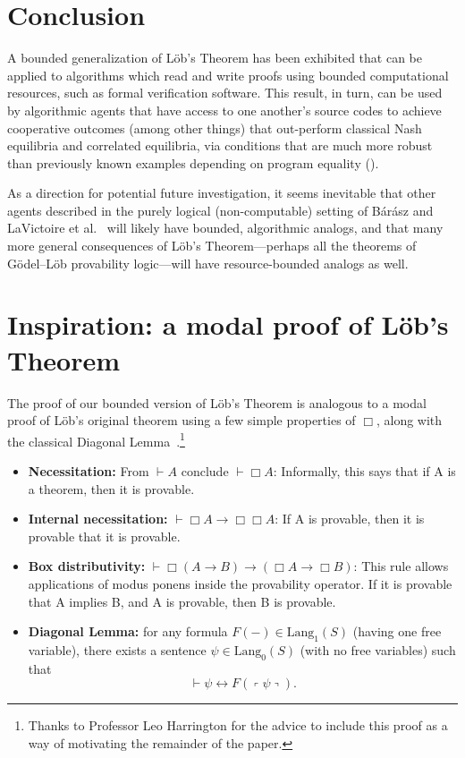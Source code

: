 \documentclass[onecolumn]{miri-tech-article}
\numberwithin{equation}{section}
\theoremstyle{definition}
\newcommand{\proves}[1]{\underset{#1}{\vdash}}
\newcommand{\Lang}{\mathrm{Lang}}
\renewcommand{\iff}{\leftrightarrow}
\newcommand{\qquote}[1]{\left\ulcorner #1 \right\urcorner}
\renewcommand{\-}{^{-1}}
\begin{document}
\section{Conclusion}
A bounded generalization of L\"{o}b's Theorem has been exhibited that can be applied to algorithms which read and write proofs using bounded computational resources, such as formal verification software.  This result, in turn, can be used by algorithmic agents that have access to one another's source codes to achieve cooperative outcomes (among other things) that out-perform classical Nash equilibria and correlated equilibria, via conditions that are much more robust than previously known examples depending on program equality (\cite{Tennenholtz:2004:Program}).

As a direction for potential future investigation, it seems inevitable that other agents described in the purely logical (non-computable) setting of  B\'{a}r\'{a}sz and LaVictoire et al.~\cite{Barasz:2014:RobustCooperation}\cite{LaVictoire:2014:PrisDilemmaLob} will likely have bounded, algorithmic analogs, and that many more general consequences of L\"{o}b's Theorem---perhaps all the theorems of G\"{o}del--L\"{o}b provability logic---will have resource-bounded analogs as well.

\appendix

\section{Inspiration: a modal proof of L\"{o}b's Theorem}

The proof of our bounded version of L\"{o}b's Theorem is analogous to a modal proof of L\"{o}b's original theorem using a few simple properties of $\Box$, along with the classical Diagonal Lemma~\cite{Carnap:1934}.\footnote{Thanks to Professor Leo Harrington for the advice to include this proof as a way of motivating the remainder of the paper.}

\begin{itemize}
\item {\bf Necessitation:} From $\vdash A$ conclude $\vdash \Box A$: Informally, this says that if A is a theorem, then it is provable.
\item {\bf Internal necessitation:} $\vdash \Box A \rightarrow \Box \Box A$: If A is provable, then it is provable that it is provable.
\item {\bf Box distributivity:} $\vdash \Box (A \rightarrow B) \rightarrow (\Box A \rightarrow \Box B)$:  This rule allows applications of modus ponens inside the provability operator. If it is provable that A implies B, and A is provable, then B is provable.
\item {\bf Diagonal Lemma:} for any formula $F(-)\in\Lang_1(S)$ (having one free variable), there exists a sentence $\psi\in\Lang_0(S)$ (with no free variables) such that $$\proves{} \psi \iff F(\qquote\psi).$$  
\end{itemize}
\end{document}
